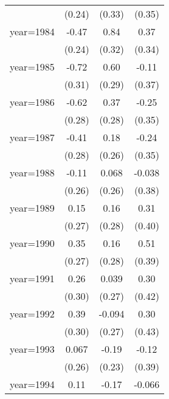 \begin{sidewaystable}[htbp]
\begin{tabular}{l*{3}{c}}
                &   (0.24)         &   (0.33)         &   (0.35)         \\
\addlinespace
year=1984       &    -0.47\sym{*}  &     0.84\sym{**} &     0.37         \\
                &   (0.24)         &   (0.32)         &   (0.34)         \\
\addlinespace
year=1985       &    -0.72\sym{**} &     0.60\sym{**} &    -0.11         \\
                &   (0.31)         &   (0.29)         &   (0.37)         \\
\addlinespace
year=1986       &    -0.62\sym{**} &     0.37         &    -0.25         \\
                &   (0.28)         &   (0.28)         &   (0.35)         \\
\addlinespace
year=1987       &    -0.41         &     0.18         &    -0.24         \\
                &   (0.28)         &   (0.26)         &   (0.35)         \\
\addlinespace
year=1988       &    -0.11         &    0.068         &   -0.038         \\
                &   (0.26)         &   (0.26)         &   (0.38)         \\
\addlinespace
year=1989       &     0.15         &     0.16         &     0.31         \\
                &   (0.27)         &   (0.28)         &   (0.40)         \\
\addlinespace
year=1990       &     0.35         &     0.16         &     0.51         \\
                &   (0.27)         &   (0.28)         &   (0.39)         \\
\addlinespace
year=1991       &     0.26         &    0.039         &     0.30         \\
                &   (0.30)         &   (0.27)         &   (0.42)         \\
\addlinespace
year=1992       &     0.39         &   -0.094         &     0.30         \\
                &   (0.30)         &   (0.27)         &   (0.43)         \\
\addlinespace
year=1993       &    0.067         &    -0.19         &    -0.12         \\
                &   (0.26)         &   (0.23)         &   (0.39)         \\
\addlinespace
year=1994       &     0.11         &    -0.17         &   -0.066         \\

\end{tabular}
\end{sidewaystable}
